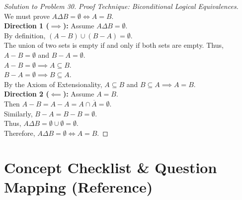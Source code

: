 \documentclass[12pt]{article}
\theoremstyle{definition}
\begin{document}
\begin{proof}[Solution to Problem 30]
\textit{Proof Technique: Biconditional Logical Equivalences.} \\
We must prove $A \Delta B = \emptyset \iff A = B$. \\
\textbf{Direction 1 ($\implies$):} Assume $A \Delta B = \emptyset$. \\
By definition, $(A - B) \cup (B - A) = \emptyset$. \\
The union of two sets is empty if and only if both sets are empty. Thus, $A - B = \emptyset$ and $B - A = \emptyset$. \\
$A - B = \emptyset \implies A \subseteq B$. \\
$B - A = \emptyset \implies B \subseteq A$. \\
By the Axiom of Extensionality, $A \subseteq B$ and $B \subseteq A \implies A = B$. \\
\textbf{Direction 2 ($\impliedby$):} Assume $A = B$. \\
Then $A - B = A - A = A \cap \overline{A} = \emptyset$. \\
Similarly, $B - A = B - B = \emptyset$. \\
Thus, $A \Delta B = \emptyset \cup \emptyset = \emptyset$. \\
Therefore, $A \Delta B = \emptyset \iff A = B$.
\end{proof}

\newpage

\section{Concept Checklist \& Question Mapping (Reference)}
\label{sec:checklist_end}
\end{document}
